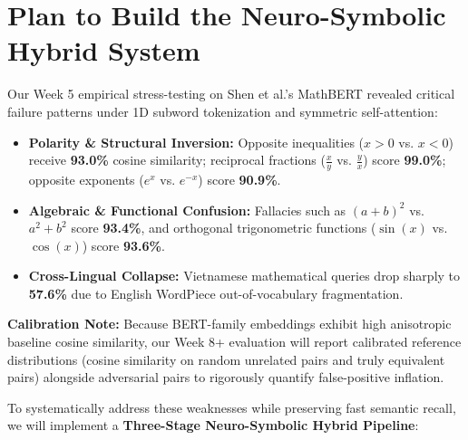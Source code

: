 \documentclass[11pt,a4paper]{article}
\begin{document}
	\section{Plan to Build the Neuro-Symbolic Hybrid System}
	Our Week 5 empirical stress-testing on Shen et al.'s MathBERT revealed critical failure patterns under 1D subword tokenization and symmetric self-attention:
	\begin{itemize}
		\item \textbf{Polarity \& Structural Inversion:} Opposite inequalities ($x > 0$ vs. $x < 0$) receive \textbf{93.0\%} cosine similarity; reciprocal fractions ($\frac{x}{y}$ vs. $\frac{y}{x}$) score \textbf{99.0\%}; opposite exponents ($e^x$ vs. $e^{-x}$) score \textbf{90.9\%}.
		\item \textbf{Algebraic \& Functional Confusion:} Fallacies such as $(a+b)^2$ vs. $a^2+b^2$ score \textbf{93.4\%}, and orthogonal trigonometric functions ($\sin(x)$ vs. $\cos(x)$) score \textbf{93.6\%}.
		\item \textbf{Cross-Lingual Collapse:} Vietnamese mathematical queries drop sharply to \textbf{57.6\%} due to English WordPiece out-of-vocabulary fragmentation.
	\end{itemize}

	\noindent \textbf{Calibration Note:} Because BERT-family embeddings exhibit high anisotropic baseline cosine similarity, our Week 8+ evaluation will report calibrated reference distributions (cosine similarity on random unrelated pairs and truly equivalent pairs) alongside adversarial pairs to rigorously quantify false-positive inflation.

	To systematically address these weaknesses while preserving fast semantic recall, we will implement a \textbf{Three-Stage Neuro-Symbolic Hybrid Pipeline}:
\end{document}
